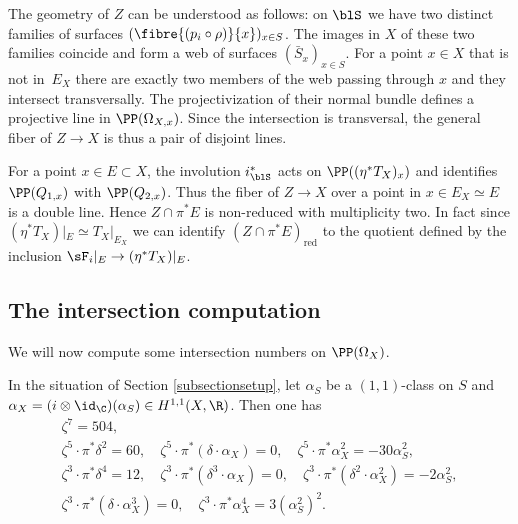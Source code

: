 \begin{remark}
The geometry of $Z$ can be understood as follows: on $\blS$ we have two distinct families
of surfaces $(\fibre{(p_i \circ \rho)}{x})_{x \in S}$. The images in $X$ of these two families
coincide
and form a web of surfaces $(\bar S_x)_{x \in S}$. For a point $x \in X$ that is not in~$E_X$
there are exactly two members of the web passing through $x$ and they intersect transversally.
The projectivization of their normal bundle defines a projective line in $\PP(\Omega_{X,x})$.
Since the intersection is transversal, the general fiber of $Z \to X$ is thus a pair of disjoint
lines.

For a point $x \in E \subset X$, the involution $i_{\blS}^*$ acts on $\PP((\eta^* T_X)_x)$ and identifies
$\PP(Q_{1,x})$ with $\PP(Q_{2,x})$.
Thus the fiber of $Z \to X$ over a point in $x \in E_X \simeq E$ is a double line.
Hence $Z \cap \pi^* E$ is non-reduced with multiplicity two.
In fact since $(\eta^* T_X)|_E \simeq T_X|_{E_X}$ we can identify
$(Z \cap \pi^* E)_\mathrm{red}$ to the quotient defined by the inclusion
$\sF_i|_E \to (\eta^* T_X)|_E$.
\end{remark}

\subsection{The intersection computation} \label{subsectionnumbers}

We will now compute some intersection numbers on $\PP(\Omega_X)$.

\begin{lemma} \label{lemmanumbersX}
In the situation of Section \ref{subsectionsetup}, let $\alpha_S$ be a $(1,1)$-class on $S$
and $\alpha_X=(i \otimes \id_\C)(\alpha_S) \in H^{1,1}(X, \R)$. Then one has
\begin{gather*}
\zeta^7 = 504,
\\
\zeta^5 \cdot \pi^* \delta^2 = 60, \quad
\zeta^5 \cdot \pi^* (\delta \cdot \alpha_X) = 0, \quad
\zeta^5 \cdot \pi^* \alpha_X^2 = - 30 \alpha_S^2,
\\
\zeta^3 \cdot \pi^* \delta^4 = 12, \quad
\zeta^3 \cdot \pi^* (\delta^3 \cdot \alpha_X) = 0 , \quad
\zeta^3 \cdot \pi^* (\delta^2 \cdot \alpha_X^2) = - 2 \alpha_S^2, \\
\zeta^3 \cdot \pi^* (\delta \cdot \alpha_X^3) = 0, \quad
\zeta^3 \cdot \pi^* \alpha_X^4 = 3 (\alpha_S^2)^2.
\end{gather*}
\end{lemma}

